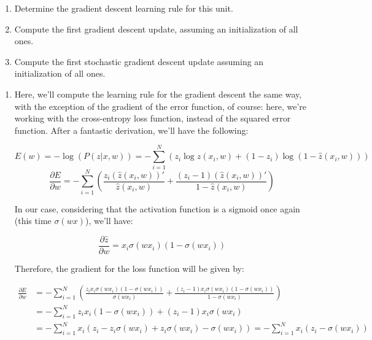 \documentclass[12pt]{article}
\begin{document}
\begin{enumerate}[leftmargin=\labelsep]
\begin{tcolorbox}[enhanced jigsaw,colback=bg,boxrule=0pt,arc=1pt,halign=center]
    \begin{enumerate}
      \item Determine the gradient descent learning rule for this unit.
      \item Compute the first gradient descent update, assuming an initialization of all ones.
      \item Compute the first stochastic gradient descent update assuming an initialization of all ones.
    \end{enumerate}
  \end{tcolorbox}

  \begin{enumerate}
    \item {
          Here, we'll compute the learning rule for the gradient descent the same way,
          with the exception of the gradient of the error function, of course: here,
          we're working with the cross-entropy loss function, instead of the squared
          error function. After a fantastic derivation, we'll have the following:

          $$
            E(w) = - \log(P(z|x, w)) = - \sum_{i=1}^N (z_i \log \hat{z}(x_i, w) + (1 - z_i) \log (1 - \hat{z}(x_i, w)))
          $$
          $$
            \frac{\partial E}{\partial w} = - \sum_{i=1}^N \left(
            \frac{z_i (\hat{z}(x_i, w))'}{\hat{z}(x_i, w)} + \frac{(z_i - 1) (\hat{z}(x_i, w))'}{1 - \hat{z}(x_i, w)}
            \right)
          $$

          In our case, considering that the activation function is a sigmoid once again
          (this time $\sigma(wx)$), we'll have:

          $$
            \frac{\partial \hat{z}}{\partial w} = x_i \sigma(w x_i) (1 - \sigma(w x_i))
          $$

          Therefore, the gradient for the loss function will be given by:

          \begin{align*}
            \frac{\partial E}{\partial w} & = - \sum_{i=1}^N \left(
            \frac{z_i x_i \sigma(w x_i) (1 - \sigma(w x_i))}{\sigma(w x_i)} +
            \frac{(z_i - 1) x_i \sigma (w x_i) (1 - \sigma(w x_i))}{1 - \sigma(w x_i)}
            \right)                                                                                                    \\
                                          & = - \sum_{i=1}^N z_i x_i (1 - \sigma(w x_i)) + (z_i - 1) x_i \sigma(w x_i) \\
                                          & = - \sum_{i=1}^N x_i \left(
            z_i - z_i \sigma(w x_i) + z_i \sigma(w x_i) - \sigma(w x_i)
            \right) = - \sum_{i=1}^N x_i (z_i - \sigma(w x_i))
          \end{align*}

}
\end{enumerate}
\end{enumerate}
\end{document}
